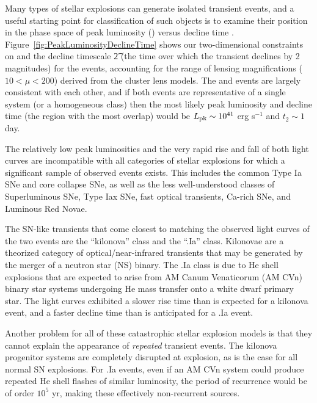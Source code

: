 Many types of stellar explosions can generate isolated transient
events, and a useful starting point for classification of such objects
is to examine their position in the phase space of peak luminosity
(\Lpk) versus decline time \cite{Kulkarni:2007}.
Figure~\ref{fig:PeakLuminosityDeclineTime} shows our two-dimensional
constraints on \Lpk and the decline timescale \t2 (the time over which
the transient declines by 2 magnitudes) for the \spock events,
accounting for the range of lensing magnifications ($10<\mu<200$)
derived from the cluster lens models.  The \spockone and \spocktwo
events are largely consistent with each other, and if both events are
representative of a single system (or a homogeneous class) then the
most likely peak luminosity and decline time (the region with the most
overlap) would be $L_{\rm pk}\sim10^{41}$ erg s$^{-1}$ and $t_2\sim1$
day.

The relatively low peak luminosities and the very rapid rise and fall
of both \spock light curves are incompatible with all categories of
stellar explosions for which a significant sample of observed events
exists.  This includes the common Type Ia SNe and core collapse SNe,
as well as the less well-understood classes of Superluminous
SNe\cite{GalYam:2012}, Type Iax SNe\citep{Foley:2013a}, fast optical
transients\cite{Drout:2014}, Ca-rich SNe\cite{Kasliwal:2012}, and
Luminous Red Novae\cite{Kulkarni:2007}.

The SN-like transients that come closest to matching the observed
light curves of the two \spock events are the ``kilonova'' class and
the ``.Ia'' class.  Kilonovae are a theorized category of
optical/near-infrared transients that may be generated by the merger
of a neutron star (NS) binary\cite{Li:1998,Kulkarni:2005}.  The .Ia
class is due to He shell explosions that are expected to arise from AM
Canum Venaticorum (AM CVn) binary star systems undergoing He mass
transfer onto a white dwarf primary star\cite{Warner:1995,
  Nelemans:2005,Bildsten:2007}.  The \spock light curves exhibited a
slower rise time than is expected for a kilonova
event\cite{Metzger:2010,Barnes:2013,Kasen:2015}, and a faster decline
time than is anticipated for a .Ia event\cite{Shen:2010}.

Another problem for all of these catastrophic stellar explosion models
is that they cannot explain the appearance of {\it repeated} transient
events.  The kilonova progenitor systems are completely disrupted at
explosion, as is the case for all normal SN explosions.  For .Ia
events, even if an AM CVn system could produce repeated He shell
flashes of similar luminosity, the period of recurrence would be of
order $10^5$ yr, making these effectively non-recurrent sources.

